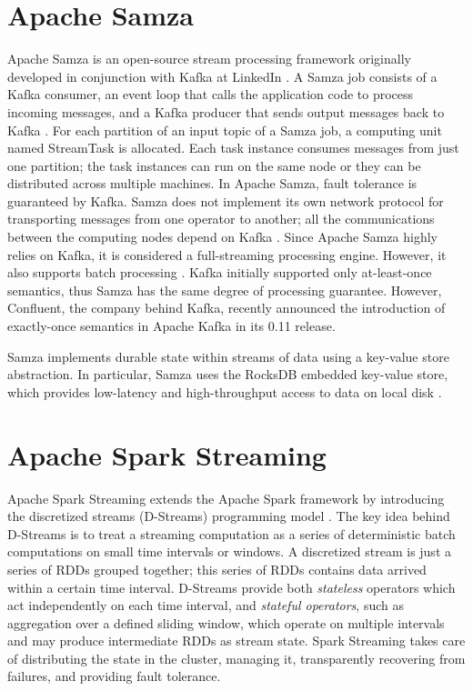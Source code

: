 \section{Apache Samza}
Apache Samza \cite{apachesamzaonline} is an open-source stream processing framework originally developed in conjunction with Kafka at LinkedIn \cite{philosophydistributeddata}. A Samza job consists of a Kafka consumer, an event loop that calls the application code to process incoming messages, and a Kafka producer that sends output messages back to Kafka \cite{philosophydistributeddata}. For each partition of an input topic of a Samza job, a computing unit named StreamTask is allocated. Each task instance consumes messages from just one partition; the task instances can run on the same node or they can be distributed across multiple machines. In Apache Samza, fault tolerance is guaranteed by Kafka. Samza does not implement its own network protocol for transporting messages from one operator to another; all the communications between the computing nodes depend on Kafka \cite{philosophydistributeddata}. Since Apache Samza highly relies on Kafka, it is considered a full-streaming processing engine. However, it also supports batch processing \cite{philosophydistributeddata}. Kafka initially supported only at-least-once semantics, thus Samza has the same degree of processing guarantee. However, Confluent, the company behind Kafka, recently announced the introduction of exactly-once semantics in Apache Kafka in its 0.11 release.

Samza implements durable state within streams of data using a key-value store abstraction. In particular, Samza uses the RocksDB \cite{rocksdbonline} embedded key-value store, which provides low-latency and high-throughput access to data on local disk \cite{philosophydistributeddata}. 

\section{Apache Spark Streaming}
Apache Spark Streaming \cite{apachesparkstreamingonline} extends the Apache Spark framework by introducing the discretized streams (D-Streams) programming model \cite{apachesparkstreaming}. The key idea behind D-Streams is to treat a streaming computation as a series of deterministic batch computations on small time intervals or windows. A discretized stream is just a series of RDDs  grouped together; this series of RDDs contains data arrived within a certain time interval. D-Streams provide both \emph{stateless} operators which act independently on each time interval, and \emph{stateful operators}, such as aggregation over a defined sliding window, which operate on multiple intervals and may produce intermediate RDDs as stream state. Spark Streaming takes care of distributing the state in the cluster, managing it, transparently recovering from failures, and providing fault tolerance.

